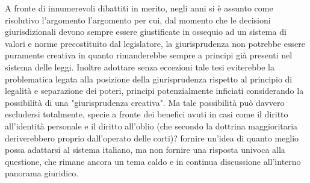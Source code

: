 A fronte di innumerevoli dibattiti in merito, negli anni si è assunto come risolutivo l’argomento l'argomento per cui, dal momento che le decisioni giurisdizionali devono sempre essere giustificate in ossequio ad un sistema di valori e norme precostituito dal legislatore, la giurisprudenza non potrebbe essere puramente creativa in quanto rimanderebbe sempre a principi già presenti nel sistema delle leggi. Inoltre adottare senza eccezioni tale tesi eviterebbe la problematica legata alla posizione della giurisprudenza rispetto al principio di legalità e separazione dei poteri, principi potenzialmente inficiati considerando la possibilità di una "giurisprudenza creativa".
Ma tale possibilità può davvero escludersi totalmente, specie a fronte dei benefici avuti in casi come il diritto all'identità personale e il diritto all'oblio (che secondo la dottrina maggioritaria deriverebbero proprio dall'operato delle corti)? 
 fornire un'idea di quanto meglio possa adattarsi al sistema italiano, ma non fornire una risposta univoca alla questione, che rimane ancora un tema caldo e in continua discussione all'interno panorama giuridico. 

